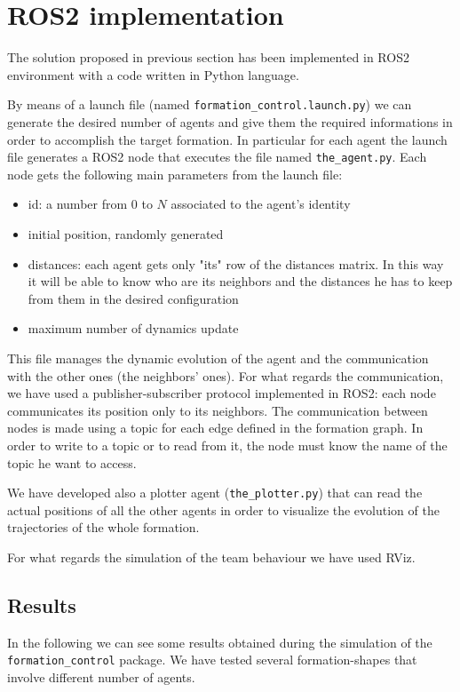 \documentclass[a4paper,11pt,oneside]{book}
\begin{document}
\section{ROS2 implementation}
The solution proposed in previous section has been implemented in ROS2 environment with a code written in Python language.

\bigskip
By means of a launch file (named \texttt{formation\_control.launch.py}) we can generate the desired number of agents and give them the required informations in order to accomplish the target formation. In particular for each agent the launch file generates a ROS2 node that executes the file named \texttt{the\_agent.py}. Each node gets the following main parameters from the launch file:
\begin{itemize}
\item id: a number from $0$ to $N$ associated to the agent's identity
\item initial position, randomly generated
\item distances: each agent gets only "its" row of the distances matrix. In this way it will be able to know who are its neighbors and the distances he has to keep from them in the desired configuration
\item maximum number of dynamics update
\end{itemize}
This file manages the dynamic evolution of the agent and the communication with the other ones (the neighbors' ones). For what regards the communication, we have used a publisher-subscriber protocol implemented in ROS2: each node communicates its position only to its neighbors. The communication between nodes is made using a topic for each edge defined in the formation graph. In order to write to a topic or to read from it, the node must know the name of the topic he want to access.

\bigskip
We have developed also a plotter agent (\texttt{the\_plotter.py}) that can read the actual positions of all the other agents in order to visualize the evolution of the trajectories of the whole formation.

For what regards the simulation of the team behaviour we have used RViz.

\subsection{Results}
In the following we can see some results obtained during the simulation of the \texttt{formation\_control} package. 
We have tested several formation-shapes that involve different number of agents.
\end{document}
